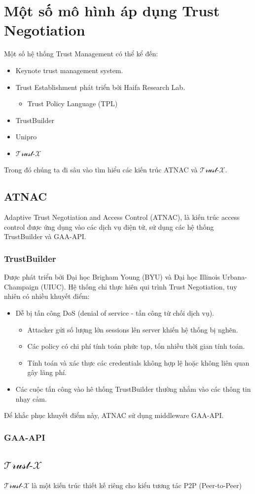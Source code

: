 \documentclass[12pt]{article}
\newcommand{\trustx}{$\mathcal{\text{Trust-}X}$}
\begin{document}
\section{Một số mô hình áp dụng Trust Negotiation}
Một số hệ thống Trust Management có thể kể đến:
\begin{itemize}
\item Keynote trust management system.
\item Trust Establishment phát triển bởi Haifa Research Lab.
\begin{itemize}
\item Trust Policy Language (TPL)\cite{848442}
\end{itemize}
\item TrustBuilder
\item Unipro
\item \trustx
\end{itemize}

Trong đó chúng ta đi sâu vào tìm hiểu các kiến trúc ATNAC và \trustx.

\subsection{ATNAC}
Adaptive Trust Negotiation and Access Control (ATNAC)\cite{10.1145/1063979.1064004}, là kiến trúc access control được ứng dụng vào các dịch vụ điện tử, sử dụng các hệ thống TrustBuilder và GAA-API.

\subsubsection{TrustBuilder}
Được phát triển bởi Đại học Brigham Young (BYU) và Đại học Illinois Urbana-Champaign (UIUC). Hệ thống chỉ thực hiên qui trình Trust Negotiation, tuy nhiên có nhiều khuyết điểm:
\begin{itemize}
\item Dễ bị tấn công DoS (denial of service - tấn công từ chối dịch vụ).
\begin{itemize}
\item Attacker gửi số lượng lớn sessions lên server khiến hệ thống bị nghẽn.
\item Các policy có chi phí tính toán phức tạp, tốn nhiều thời gian tính toán.
\item Tính toán và xác thực các credentials không hợp lệ hoặc không liên quan gây lãng phí. 
\end{itemize}
\item Các cuộc tấn công vào hê thống TrustBuilder thường nhắm vào các thông tin nhạy cảm.
\end{itemize}
Để khắc phục khuyết điểm này, ATNAC sử dụng middleware GAA-API.

\subsubsection{GAA-API}


\subsection{\trustx}
\trustx\cite{10.1109/TKDE.2004.1318565} là một kiến trúc thiết kế riêng cho kiểu tương tác P2P (Peer-to-Peer)



\end{document}
